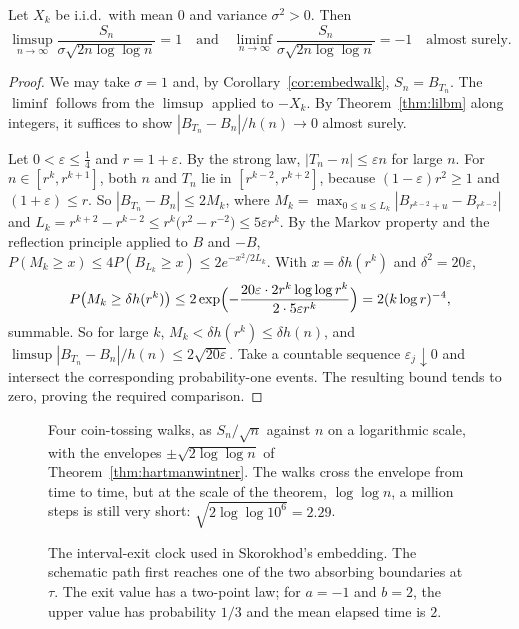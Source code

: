 \begin{theorem}\label{thm:hartmanwintner}
Let $X_k$ be i.i.d.\ with mean $0$ and variance $\sigma^2>0$. Then
\[
\limsup_{n\to\infty}\frac{S_n}{\sigma\sqrt{2n\log\log n}}=1\quad\text{and}\quad\liminf_{n\to\infty}\frac{S_n}{\sigma\sqrt{2n\log\log n}}=-1\quad\text{almost surely.}
\]
\end{theorem}
\begin{proof}
We may take $\sigma=1$ and, by Corollary~\ref{cor:embedwalk}, $S_n=B_{T_n}$. The $\liminf$ follows from the $\limsup$ applied to $-X_k$. By Theorem~\ref{thm:lilbm} along integers, it
suffices to show $|B_{T_n}-B_n|/h(n)\to0$ almost surely.

Let $0<\varepsilon\le\frac14$ and $r=1+\varepsilon$. By the strong law, $|T_n-n|\le\varepsilon n$ for large $n$. For $n\in[r^k,r^{k+1}]$, both $n$ and $T_n$ lie in $[r^{k-2},r^{k+2}]$,
because $(1-\varepsilon)r^2\ge1$ and $(1+\varepsilon)\le r$. So $|B_{T_n}-B_n|\le2M_k$, where $M_k=\max_{0\le u\le L_k}|B_{r^{k-2}+u}-B_{r^{k-2}}|$ and $L_k=r^{k+2}-r^{k-2}\le
r^k\bigl(r^2-r^{-2}\bigr)\le5\varepsilon r^k$. By the Markov property and the reflection principle applied to $B$ and $-B$, $P(M_k\ge x)\le4P(B_{L_k}\ge x)\le2e^{-x^2/2L_k}$. With
$x=\delta h(r^k)$ and $\delta^2=20\varepsilon$,
\[
P\bigl(M_k\ge\delta h(r^k)\bigr)\le2\exp\Bigl(-\frac{20\varepsilon\cdot2r^k\log\log r^k}{2\cdot5\varepsilon r^k}\Bigr)=2(k\log r)^{-4},
\]
summable. So for large $k$, $M_k<\delta h(r^k)\le\delta h(n)$, and $\limsup|B_{T_n}-B_n|/h(n)\le2\sqrt{20\varepsilon}$. Take a countable sequence $\varepsilon_j\downarrow0$ and intersect the corresponding probability-one events. The resulting bound tends to zero, proving the required comparison.
\end{proof}

\begin{figure}[ht]
\centering{}
\caption{Four coin-tossing walks, as $S_n/\sqrt n$ against $n$ on a logarithmic scale, with the envelopes $\pm\sqrt{2\log\log n}$ of Theorem~\ref{thm:hartmanwintner}. The
walks cross the envelope from time to time, but at the scale of the theorem, $\log\log n$, a million steps is still very short: $\sqrt{2\log\log10^6}=2.29$.}
\label{fig:lil}
\end{figure}

\begin{figure}[ht]
\centering{}
\caption{The interval-exit clock used in Skorokhod's embedding. The schematic path first reaches one of the two absorbing boundaries at $\tau$. The exit value has a two-point law; for $a=-1$ and $b=2$, the upper value has probability $1/3$ and the mean elapsed time is $2$.}
\label{fig:v11-ch03-exit-clock}
\end{figure}

